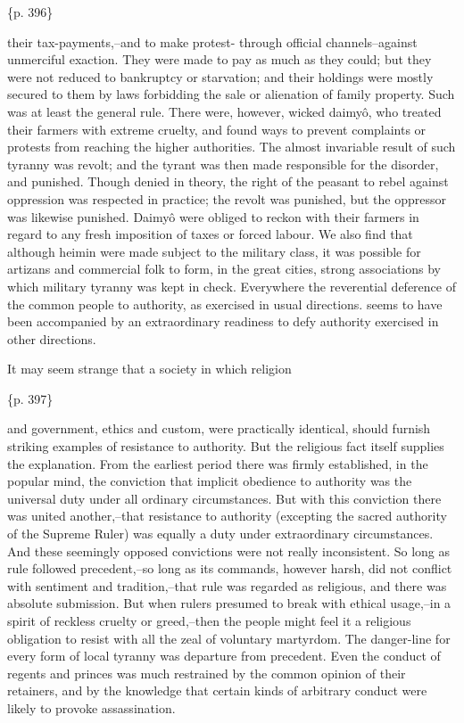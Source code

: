 \{p. 396\}

their tax-payments,--and to make protest- through official channels--against unmerciful exaction. They were made to pay as much as they could; but they were not reduced to bankruptcy or starvation; and their holdings were mostly secured to them by laws forbidding the sale or alienation of family property. Such was at least the general rule. There were, however, wicked daimyô, who treated their farmers with extreme cruelty, and found ways to prevent complaints or protests from reaching the higher authorities. The almost invariable result of such tyranny was revolt; and the tyrant was then made responsible for the disorder, and punished. Though denied in theory, the right of the peasant to rebel against oppression was respected in practice; the revolt was punished, but the oppressor was likewise punished. Daimyô were obliged to reckon with their farmers in regard to any fresh imposition of taxes or forced labour. We also find that although heimin were made subject to the military class, it was possible for artizans and commercial folk to form, in the great cities, strong associations by which military tyranny was kept in check. Everywhere the reverential deference of the common people to authority, as exercised in usual directions. seems to have been accompanied by an extraordinary readiness to defy authority exercised in other directions.

It may seem strange that a society in which religion

\{p. 397\}

and government, ethics and custom, were practically identical, should furnish striking examples of resistance to authority. But the religious fact itself supplies the explanation. From the earliest period there was firmly established, in the popular mind, the conviction that implicit obedience to authority was the universal duty under all ordinary circumstances. But with this conviction there was united another,--that resistance to authority (excepting the sacred authority of the Supreme Ruler) was equally a duty under extraordinary circumstances. And these seemingly opposed convictions were not really inconsistent. So long as rule followed precedent,--so long as its commands, however harsh, did not conflict with sentiment and tradition,--that rule was regarded as religious, and there was absolute submission. But when rulers presumed to break with ethical usage,--in a spirit of reckless cruelty or greed,--then the people might feel it a religious obligation to resist with all the zeal of voluntary martyrdom. The danger-line for every form of local tyranny was departure from precedent. Even the conduct of regents and princes was much restrained by the common opinion of their retainers, and by the knowledge that certain kinds of arbitrary conduct were likely to provoke assassination.

